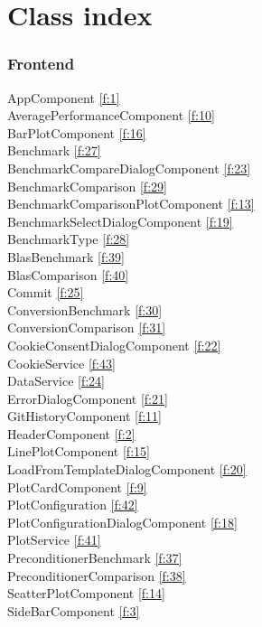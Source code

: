 \section{Class index}
\subsubsection{Frontend}

AppComponent \ref{f:1} \\
AveragePerformanceComponent \ref{f:10} \\
BarPlotComponent \ref{f:16} \\
Benchmark \ref{f:27} \\
BenchmarkCompareDialogComponent \ref{f:23} \\
BenchmarkComparison \ref{f:29} \\
BenchmarkComparisonPlotComponent \ref{f:13} \\
BenchmarkSelectDialogComponent \ref{f:19} \\
BenchmarkType \ref{f:28} \\
BlasBenchmark  \ref{f:39} \\
BlasComparison  \ref{f:40} \\
Commit \ref{f:25} \\
ConversionBenchmark  \ref{f:30} \\
ConversionComparison  \ref{f:31} \\
CookieConsentDialogComponent \ref{f:22} \\
CookieService \ref{f:43} \\
DataService \ref{f:24} \\
ErrorDialogComponent \ref{f:21} \\
GitHistoryComponent \ref{f:11} \\
HeaderComponent \ref{f:2} \\
LinePlotComponent \ref{f:15} \\
LoadFromTemplateDialogComponent \ref{f:20} \\
PlotCardComponent \ref{f:9} \\
PlotConfiguration \ref{f:42} \\
PlotConfigurationDialogComponent \ref{f:18} \\
PlotService \ref{f:41} \\
PreconditionerBenchmark  \ref{f:37} \\
PreconditionerComparison  \ref{f:38} \\
ScatterPlotComponent \ref{f:14} \\
SideBarComponent \ref{f:3} \\
